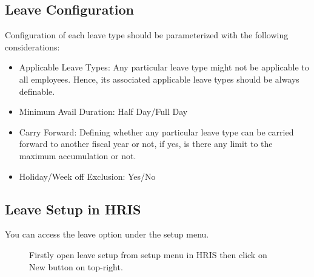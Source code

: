 \documentclass[letterpaper,10pt,english]{sphinxmanual}
\begin{document}
\subsection{Leave Configuration}
\label{\detokenize{leave-holiday/leave-configuration:leave-configuration}}
Configuration of each leave type should be parameterized with the following considerations:
\begin{itemize}
\item {} 
Applicable Leave Types: Any particular leave type might not be applicable to all employees. Hence, its associated applicable leave types should be always definable.

\item {} 
Minimum Avail Duration: Half Day/Full Day

\item {} 
Carry Forward: Defining whether any particular leave type can be carried forward to another fiscal year or not, if yes, is there any limit to the maximum accumulation or not.

\item {} 
Holiday/Week off Exclusion: Yes/No

\end{itemize}


\subsection{Leave Setup in HRIS}
\label{\detokenize{leave-holiday/leave-configuration:leave-setup-in-hris}}
You can access the leave option under the setup menu.

\begin{figure}[htbp]
\centering
\capstart

\noindent{}
\caption{Firstly open leave setup from setup menu in HRIS then click on New button on top-right.}\label{\detokenize{leave-holiday/leave-configuration:id1}}\end{figure}
\end{document}
